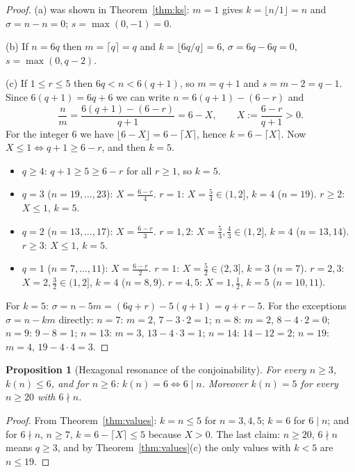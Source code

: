 \documentclass[11pt,a4paper]{article}
\newtheorem{proposition}[theorem]{Proposition}
\theoremstyle{definition}
\theoremstyle{remark}
\begin{document}
\begin{proof}
(a) was shown in Theorem~\ref{thm:ks}: $m=1$ gives $k=\lfloor n/1\rfloor=n$ and $\sigma=n-n=0$; $s=\max(0,-1)=0$.

(b) If $n=6q$ then $m=\lceil q\rceil=q$ and $k=\lfloor6q/q\rfloor=6$, $\sigma=6q-6q=0$, $s=\max(0,q-2)$.

(c) If $1\le r\le5$ then $6q<n<6(q+1)$, so $m=q+1$ and $s=m-2=q-1$. Since $6(q+1)=6q+6$ we can write $n=6(q+1)-(6-r)$ and
\[
\frac nm=\frac{6(q+1)-(6-r)}{q+1}=6-X,\qquad X:=\frac{6-r}{q+1}>0 .
\]
For the integer $6$ we have $\lfloor6-X\rfloor=6-\lceil X\rceil$, hence $k=6-\lceil X\rceil$. Now $X\le1\iff q+1\ge6-r$, and then $k=5$.
\begin{itemize}[nosep]
\item $q\ge4$: $q+1\ge5\ge6-r$ for all $r\ge1$, so $k=5$.
\item $q=3$ ($n=19,\dots,23$): $X=\frac{6-r}4$. $r=1$: $X=\frac54\in(1,2]$, $k=4$ ($n=19$). $r\ge2$: $X\le1$, $k=5$.
\item $q=2$ ($n=13,\dots,17$): $X=\frac{6-r}3$. $r=1,2$: $X=\frac53,\frac43\in(1,2]$, $k=4$ ($n=13,14$). $r\ge3$: $X\le1$, $k=5$.
\item $q=1$ ($n=7,\dots,11$): $X=\frac{6-r}2$. $r=1$: $X=\frac52\in(2,3]$, $k=3$ ($n=7$). $r=2,3$: $X=2,\frac32\in(1,2]$, $k=4$ ($n=8,9$). $r=4,5$: $X=1,\frac12$, $k=5$ ($n=10,11$).
\end{itemize}
For $k=5$: $\sigma=n-5m=(6q+r)-5(q+1)=q+r-5$. For the exceptions $\sigma=n-km$ directly: $n=7$: $m=2$, $7-3\cdot2=1$; $n=8$: $m=2$, $8-4\cdot2=0$; $n=9$: $9-8=1$; $n=13$: $m=3$, $13-4\cdot3=1$; $n=14$: $14-12=2$; $n=19$: $m=4$, $19-4\cdot4=3$.
\end{proof}

\begin{proposition}[Hexagonal resonance of the conjoinability]\label{prop:hex}
For every $n\ge3$, $k(n)\le6$, and for $n\ge6$: $k(n)=6\iff6\mid n$. Moreover $k(n)=5$ for every $n\ge20$ with $6\nmid n$.
\end{proposition}
\begin{proof}
From Theorem~\ref{thm:values}: $k=n\le5$ for $n=3,4,5$; $k=6$ for $6\mid n$; and for $6\nmid n$, $n\ge7$, $k=6-\lceil X\rceil\le5$ because $X>0$. The last claim: $n\ge20$, $6\nmid n$ means $q\ge3$, and by Theorem~\ref{thm:values}(c) the only values with $k<5$ are $n\le19$.
\end{proof}
\end{document}
